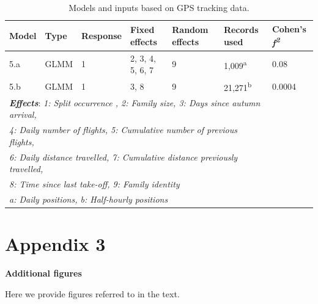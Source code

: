 \documentclass[10pt,twocolumn]{paper}
\begin{document}
\begin{table}[H]
\begin{tabular}{l*6l}
\toprule
Model & Type & Response & Fixed effects & Random effects & Records used & Cohen's \emph{f\textsuperscript{2}}\\
\midrule
5.a & GLMM & 1 & 2, 3, 4, 5, 6, 7 & 9 & 1,009\textsuperscript{a} & 0.08 \\

5.b & GLMM & 1 & 3, 8 & 9 & 21,271\textsuperscript{b} & 0.0004\\
\midrule
\multicolumn{6}{l}{\textbf{\emph{Effects}}: \emph{1: Split occurrence , 2: Family size, 3: Days since autumn arrival,}}\\
\multicolumn{6}{l}{\emph{4: Daily number of flights, 5: Cumulative number of previous flights,}}\\
\multicolumn{6}{l}{\emph{6: Daily distance travelled, 7: Cumulative distance previously travelled,}}\\
\multicolumn{6}{l}{\emph{8: Time since last take-off, 9: Family identity}}\\
\midrule
\multicolumn{6}{l}{\emph{a: Daily positions, b: Half-hourly positions}}\\
\bottomrule
\end{tabular}

\caption{Models and inputs based on GPS tracking data.}

\end{table}

\clearpage

\section{Appendix 3}\label{appendix-3}

\textbf{Additional figures}

Here we provide figures referred to in the text.
\end{document}
